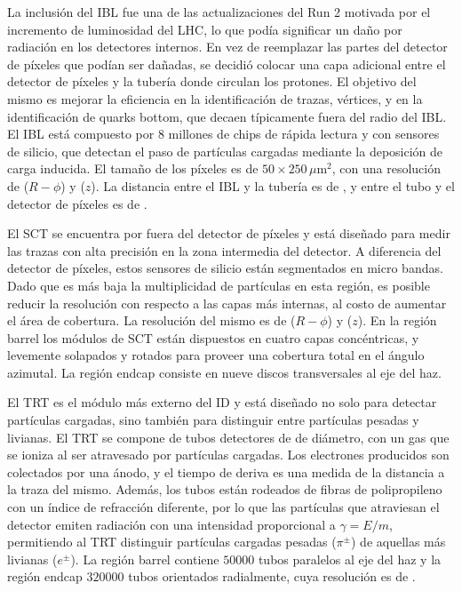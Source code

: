 La inclusión del IBL fue una de las actualizaciones del Run 2 motivada por el incremento de luminosidad del LHC, lo que podía significar un daño por radiación en los detectores internos. En vez de reemplazar las partes del detector de píxeles que podían ser dañadas, se decidió colocar una capa adicional entre el detector de píxeles y la tubería donde circulan los protones. El objetivo del mismo es mejorar la eficiencia en la identificación de trazas, vértices, y en la identificación de quarks bottom, que decaen típicamente fuera del radio del IBL. El IBL está compuesto por $8$ millones de chips de rápida lectura y con sensores de silicio, que detectan el paso de partículas cargadas mediante la deposición de carga inducida. El tamaño de los píxeles es de $50\times250\,\mu$m$^{2}$, con una resolución de  ($R-\phi$) y  ($z$). La distancia entre el IBL y la tubería es de , y entre el tubo y el detector de píxeles es de . 



El SCT se encuentra por fuera del detector de píxeles y está diseñado para medir las trazas con alta precisión en la zona intermedia del detector. A diferencia del detector de píxeles, estos sensores de silicio están segmentados en micro bandas. Dado que es más baja la multiplicidad de partículas en esta región, es posible reducir la resolución con respecto a las capas más internas, al costo de aumentar el área de cobertura. La resolución del mismo es de  ($R-\phi$) y  ($z$). En la región barrel los módulos de SCT están dispuestos en cuatro capas concéntricas, y levemente solapados y rotados para proveer una cobertura total en el ángulo azimutal. La región endcap consiste en nueve discos transversales al eje del haz.




El TRT es el módulo más externo del ID y está diseñado no solo para detectar partículas cargadas, sino también para distinguir entre partículas pesadas y livianas. El TRT se compone de tubos detectores de  de diámetro, con un gas que se ioniza al ser atravesado por partículas cargadas. Los electrones producidos son colectados por una ánodo, y el tiempo de deriva es una medida de la distancia a la traza del mismo. Además, los tubos están rodeados de fibras de polipropileno con un índice de refracción diferente, por lo que las partículas que atraviesan el detector emiten radiación con una intensidad proporcional a $\gamma=E/m$, permitiendo al TRT  distinguir partículas cargadas pesadas ($\pi^{\pm}$) de aquellas más livianas ($e^{\pm}$). La región barrel contiene $50000$ tubos paralelos al eje del haz y la región endcap $320000$ tubos orientados radialmente, cuya resolución es de .




